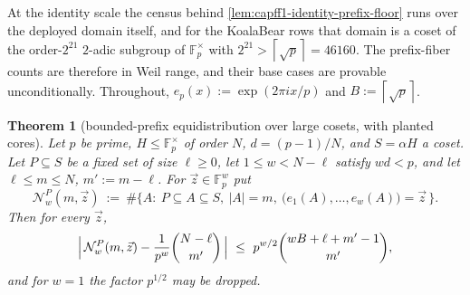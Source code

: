 \documentclass[11pt]{article}
\newtheorem{theorem}{Theorem}[section]
\theoremstyle{definition}
\theoremstyle{remark}
\newcommand{\F}{\mathbb{F}}
\providecommand{\ceil}[1]{\left\lceil #1\right\rceil}
\begin{document}
At the identity scale the census behind \cref{lem:capff1-identity-prefix-floor} runs over the deployed domain itself, and for the KoalaBear rows that domain is a coset of the order-$2^{21}$ $2$-adic subgroup of $\F_p^\times$ with $2^{21}>\ceil{\sqrt p}=46160$.  The prefix-fiber counts are therefore in Weil range, and their base cases are provable unconditionally.  Throughout, $e_p(x):=\exp(2\pi ix/p)$ and $B:=\ceil{\sqrt p}$.

\begin{theorem}[bounded-prefix equidistribution over large cosets, with planted cores]\label{thm:capff1-collision-base}
Let $p$ be prime, $H\le\F_p^\times$ of order $N$, $d=(p-1)/N$, and $S=\alpha H$ a coset.  Let $P\subseteq S$ be a fixed set of size $\ell\ge0$, let $1\le w<N-\ell$ satisfy $wd<p$, and let $\ell\le m\le N$, $m':=m-\ell$.  For $\vec z\in\F_p^w$ put
\[
        \mathcal N_w^P(m,\vec z)\ :=\ \#\bigl\{A:\ P\subseteq A\subseteq S,\ |A|=m,\ \bigl(e_1(A),\ldots,e_w(A)\bigr)=\vec z\,\bigr\}.
\]
Then for every $\vec z$,
\[
        \Bigl|\,\mathcal N_w^P(m,\vec z)-\frac1{p^w}\binom{N-\ell}{m'}\,\Bigr|
        \ \le\ p^{w/2}\binom{wB+\ell+m'-1}{m'},
\]
and for $w=1$ the factor $p^{1/2}$ may be dropped.
\end{theorem}
\end{document}
